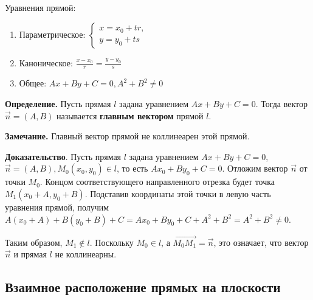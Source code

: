 \documentclass[a4paper]{article}
\begin{document}
    Уравнения прямой:
    \begin{enumerate}


        \item Параметрическое: $
        \begin{cases}
            x = x_0 + tr,
            \\
            y = y_0 + ts
        \end{cases}$

        \item Каноническое: $\displaystyle \frac{x-x_0}{r} = \frac{y-y_0}{s}$
        \item Общее: $Ax + By + C = 0, A^2 + B^2 \neq 0$
    \end{enumerate}

    \textbf{Определение.} Пусть прямая $l$ задана уравнением $Ax + By + C = 0$. Тогда вектор $\vec{n} = (A, B)$ называется \textbf{главным вектором} прямой $l$.

    \begin{htheorem}
        \textbf{Замечание.} Главный вектор прямой не коллинеарен этой прямой.
    \end{htheorem}


    \begin{hproof}
        \textbf{Доказательство}. Пусть прямая $l$ задана уравнением $Ax + By + C = 0$, $\vec{n} = (A, B), M_0 (x_0, y_0) \in l$, то есть $Ax_0 + By_0 + C = 0$. Отложим вектор $\vec{n}$ от точки $M_0$. Концом соответствующего направленного отрезка будет точка $M_1(x_0 + A, y_0 + B)$. Подставив координаты этой точки в левую часть уравнения прямой, получим $A (x_0 + A) + B(y_0 + B) + C = Ax_0 + By_0 + C + A^2 + B^2 = A^2 + B^2 \neq 0$.

        Таким образом, $M_1 \notin l$. Поскольку $M_0 \in l$, а $\overrightarrow{M_0 M_1} = \vec{n}$, это означает, что вектор $\vec{n}$ и прямая $l$ не коллинеарны.

    \end{hproof}

    \newpage \begin{center}
                 \begin{Large}
                 \end{Large}
    \end{center}
    \subsection*{Взаимное расположение прямых на плоскости}
\end{document}
